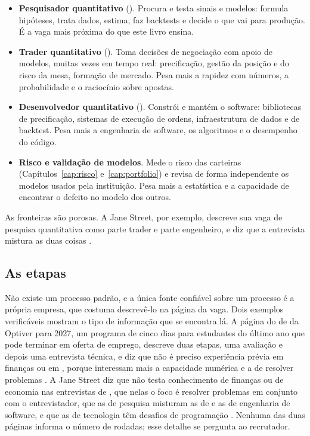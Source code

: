 \begin{itemize}
  \item \textbf{Pesquisador quantitativo} (). Procura e testa sinais e modelos: formula hipóteses, trata dados, estima, faz backtests e decide o que vai para produção. É a vaga mais próxima do que este livro ensina.
  \item \textbf{Trader quantitativo} (). Toma decisões de negociação com apoio de modelos, muitas vezes em tempo real: precificação, gestão da posição e do risco da mesa, formação de mercado. Pesa mais a rapidez com números, a probabilidade e o raciocínio sobre apostas.
  \item \textbf{Desenvolvedor quantitativo} (). Constrói e mantém o software: bibliotecas de precificação, sistemas de execução de ordens, infraestrutura de dados e de backtest. Pesa mais a engenharia de software, os algoritmos e o desempenho do código.
  \item \textbf{Risco e validação de modelos}. Mede o risco das carteiras (Capítulos~\ref{cap:risco} e~\ref{cap:portfolio}) e revisa de forma independente os modelos usados pela instituição. Pesa mais a estatística e a capacidade de encontrar o defeito no modelo dos outros.
\end{itemize}

As fronteiras são porosas. A Jane Street, por exemplo, descreve sua vaga de pesquisa quantitativa como parte trader e parte engenheiro, e diz que a entrevista mistura as duas coisas \citep{janestreet2026}.

\subsection{As etapas}

Não existe um processo padrão, e a única fonte confiável sobre um processo é a própria empresa, que costuma descrevê-lo na página da vaga. Dois exemplos verificáveis mostram o tipo de informação que se encontra lá. A página do  de  da Optiver para 2027, um programa de cinco dias para estudantes do último ano que pode terminar em oferta de emprego, descreve duas etapas, uma avaliação  e depois uma entrevista técnica, e diz que não é preciso experiência prévia em finanças ou em , porque interessam mais a capacidade numérica e a de resolver problemas \citep{optiver2026}. A Jane Street diz que não testa conhecimento de finanças ou de economia nas entrevistas de , que nelas o foco é resolver problemas em conjunto com o entrevistador, que as de pesquisa misturam as de  e as de engenharia de software, e que as de tecnologia têm desafios de programação \citep{janestreet2026}. Nenhuma das duas páginas informa o número de rodadas; esse detalhe se pergunta ao recrutador.

